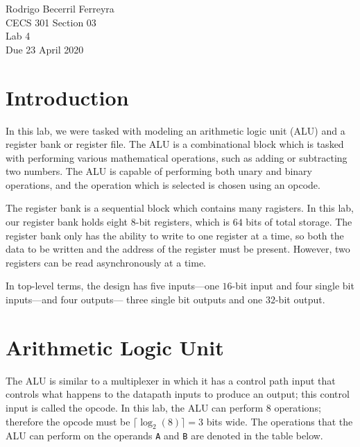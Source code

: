 \documentclass{article}
\begin{document}
\begin{flushright}
    \noindent
    Rodrigo Becerril Ferreyra\\
    CECS 301 Section 03\\
    Lab 4\\
    Due 23 April 2020
\end{flushright}

\section{Introduction} In this lab, we were tasked with
modeling an arithmetic logic unit (ALU) and
a register bank or register file. The ALU
is a combinational block which is tasked
with performing various mathematical operations,
such as adding or
subtracting two numbers. The ALU is capable of performing
both unary and binary operations, and the
operation which is selected is
chosen using an opcode.

The register bank is a sequential block which contains many
ragisters. In this lab, our register bank holds eight
\(8\)-bit registers, which is \(64\) bits of total storage. The register
bank only has the ability to write to one register at a time,
so both the data to be written and the address of the register
must be present. However, two registers can be read asynchronously
at a time.

In top-level terms, the design has five inputs---one \(16\)-bit
input and four single bit inputs---and four outputs---
three single bit outputs and one \(32\)-bit output.

\section{Arithmetic Logic Unit} The ALU is similar to a
multiplexer in which it has a control path input that controls
what happens to the datapath inputs to produce an output;
this control input is called the opcode.
In this lab, the ALU can perform \(8\) operations; therefore
the opcode must be \(\lceil\log_2(8)\rceil = 3\) bits wide.
The operations that the ALU can perform on the operands
\texttt{A} and \texttt{B} are denoted in the table below.
\end{document}
